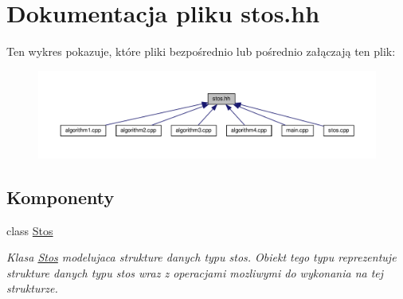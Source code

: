 \hypertarget{stos_8hh}{\section{Dokumentacja pliku stos.\-hh}
\label{stos_8hh}
}
Ten wykres pokazuje, które pliki bezpośrednio lub pośrednio załączają ten plik\-:\nopagebreak
\begin{figure}[H]
\begin{center}
\leavevmode
\includegraphics[width=350pt]{stos_8hh__dep__incl}
\end{center}
\end{figure}
\subsection*{Komponenty}
\begin{DoxyCompactItemize}
\item 
class \hyperlink{class_stos}{Stos}
\begin{DoxyCompactList}\small\item\em Klasa \hyperlink{class_stos}{Stos} modelujaca strukture danych typu stos. Obiekt tego typu reprezentuje strukture danych typu stos wraz z operacjami mozliwymi do wykonania na tej strukturze. \end{DoxyCompactList}\end{DoxyCompactItemize}
